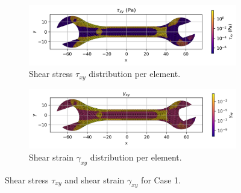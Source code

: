 \begin{figure}[H]
    \centering
    \begin{subfigure}[t]{0.49\textwidth}
      \centering
      \includegraphics[width=\textwidth]{GRAFICOS/Case b - tau_xy_per_element.png}
      \caption{Shear stress $\tau_{xy}$ distribution per element.}
      \label{fig:tau_xy_b}
    \end{subfigure}
    \hfill
    \begin{subfigure}[t]{0.49\textwidth}
      \centering
      \includegraphics[width=\textwidth]{GRAFICOS/Case b - gamma_xy_per_element.png}
      \caption{Shear strain $\gamma_{xy}$ distribution per element.}
      \label{fig:gamma_xy_b}
    \end{subfigure}
    \caption{Shear stress $\tau_{xy}$ and shear strain $\gamma_{xy}$ for Case 1.}
    \label{fig:shear_fields_b}
\end{figure}

